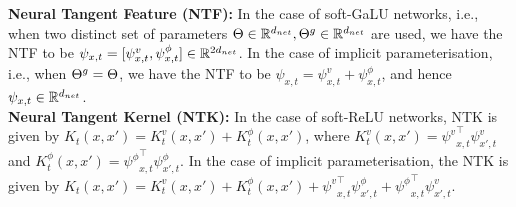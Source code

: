 \begin{comment}
$\lambda_t(s,s')$ is to be understood as the measure of overlap of the sub-networks that are active for both the inputs $x,x'\in\R^{d_{in}}$. Note that the definition of $\lambda_t$ is independent of $i\in [d_{in}]$: owing to symmetry the same number of paths start from any given input node, and looking forward, the paths see exactly the same gates and gating values in the subsequent layers.
\end{comment}
\begin{comment}
Given that the output of a DGN is expressed as $\hat{y}_t(x)=\phi_{x,t}^\top v_t$, we define the following:\\
$1.$ \textbf{Value gradient:} $\psi_{x,t}^v=(\nabla_{\Theta}v_t)^\top  \phi_{x,t}$, which learns the value of the paths keeping the NPF fixed. \\
$2.$ \textbf{Feature gradient:}  $\psi_{x,t}^{\phi}=(\nabla_{\Tg}\phi_{x,t})^\top v_t $, which learns the NPFs keeping the value of the paths fixed. Note that the feature gradient is $0$ in the case of hard-gates.
To the best of our knowledge, for the first time in the literature, we note that the gradient flow has two components. Note that, in the value and feature gradients, quantities $\nabla_{\Theta}v_t$ and $\nabla_{\Tg}\phi_{x,t}$ are $P\times d_{net}$ matrices, which are obtained by computing the derivative of $v_t(p)$ and $\phi_{x,t}(p)$ for all paths $p\in[P]$ with respect to the respective $d_{net}$ parameters.\\
\end{comment}
\textbf{Neural Tangent Feature (NTF):} In the case of soft-GaLU networks, i.e., when two distinct set of parameters $\Theta\in\mathbb{R}^{d_{net}}, {\Theta}^g\in\mathbb{R}^{d_{net}}$ are used, we have the NTF to be $\psi_{x,t}=[\psi^v_{x,t},\psi^{\phi}_{x,t}]\in \mathbb{R}^{2d_{net}}$. In the case of implicit parameterisation, i.e., when ${\Theta}^g=\Theta$, we have the NTF to be $\psi_{x,t}=\psi^v_{x,t}+\psi^{\phi}_{x,t}$, and hence $\psi_{x,t}\in\mathbb{R}^{d_{net}}$.\\
\textbf{Neural Tangent Kernel (NTK):} In the case of soft-ReLU networks, NTK is given by $K_t(x,x')=K^v_t(x,x')+K^{\phi}_t(x,x')$, where $K^v_t(x,x')={\psi^v}^\top_{x,t}\psi^v_{x',t}$ and $K^{\phi}_t(x,x')={\psi^{\phi}}^\top_{x,t}\psi^{\phi}_{x',t}$. In the case of implicit parameterisation, the NTK is given by $K_t(x,x')=K^v_t(x,x')+K^{\phi}_t(x,x')+{\psi^v}^\top_{x,t} \psi^{\phi}_{x',t} + {\psi^{\phi}}^\top_{x,t} \psi^{v}_{x',t}$.
